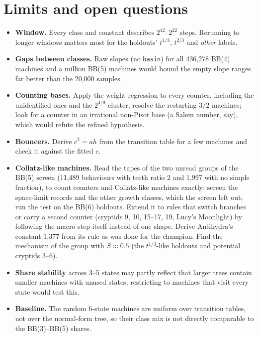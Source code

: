 \documentclass[11pt,a4paper]{article}
\newcommand{\BB}[1]{BB(#1)}
\begin{document}
\section{Limits and open questions}
\begin{itemize}
\item \textbf{Window.} Every class and constant describes $2^{12}$--$2^{22}$ steps. Rerunning to
longer windows matters most for the holdouts' $t^{1/3}$, $t^{2/3}$ and \emph{other} labels.
\item \textbf{Gaps between classes.} Raw slopes (no \texttt{basin}) for all 436,278 \BB{4}
machines and a million \BB{5} machines would bound the empty slope ranges far better than the
20,000 samples.
\item \textbf{Counting bases.} Apply the weight regression to every counter, including the
unidentified ones and the $2^{4/9}$ cluster; resolve the restarting $3/2$ machines; look for a
counter in an irrational non-Pisot base (a Salem number, say), which would refute the refined
hypothesis.
\item \textbf{Bouncers.} Derive $c^2 = ah$ from the transition table for a few machines and check
it against the fitted $c$.
\item \textbf{Collatz-like machines.} Read the tapes of the two unread groups of the \BB{5} screen
(11,489 behaviours with teeth ratio 2 and 1,997 with no simple fraction), to count counters and
Collatz-like machines exactly; screen the space-limit records and the other growth classes, which
the screen left out; run the test on the \BB{6} holdouts. Extend it to
rules that switch branches or carry a second counter (cryptids 9, 10, 15--17, 19, Lucy's
Moonlight) by following the macro step itself instead of one shape. Derive Antihydra's constant
$1.377$ from its rule as was done for the champion. Find the mechanism of the group with
$S \approx 0.5$ (the $t^{1/3}$-like holdouts and potential cryptids 3--6).
\item \textbf{Share stability} across 3--5 states may partly reflect that larger trees contain
smaller machines with unused states; restricting to machines that visit every state would test
this.
\item \textbf{Baseline.} The random 6-state machines are uniform over transition tables, not over
the normal-form tree, so their class mix is not directly comparable to the \BB{3}--\BB{5} shares.
\end{itemize}

\end{document}
